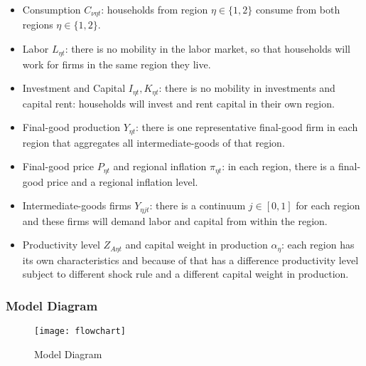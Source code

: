 \documentclass[
thesis.tex
]{subfiles}
\begin{document}
\begin{itemize}
	\item Consumption \(C_{\nu \eta t}\): households from region $\eta \in \{1,2\}$ consume from both regions $\eta \in \{1,2\}$.
	
	\item Labor \(L_{\eta t}\): there is no mobility in the labor market, so that households will work for firms in the same region they live.
	
	\item Investment and Capital \(I_{\eta t}, K_{\eta t}\): there is no mobility in investments and capital rent: households will invest and rent capital in their own region.
	
	\item Final-good production \(Y_{\eta t}\): there is one representative final-good firm in each region that aggregates all intermediate-goods of that region.
	
	\item Final-good price \(P_{\eta t}\) and regional inflation \(\pi_{\eta t}\): in each region, there is a final-good price and a regional inflation level.
	
	\item Intermediate-goods firms \(Y_{\eta jt}\): there is a continuum $j \in [0,1]$ for each region and these firms will demand labor and capital from within the region.
	
	\item Productivity level \(Z_{A\eta t}\) and capital weight in production $\alpha_{\eta}$: each region has its own characteristics and because of that has a difference productivity level subject to different shock rule and a different capital weight in production.
	
\end{itemize}


\subsubsection*{Model Diagram}

\begin{figure}[h!]
	\centering
	\texttt{[image: flowchart]}
	\caption{Model Diagram}
	\label{fig:model-diagram}
\end{figure}

\newpage
\end{document}
